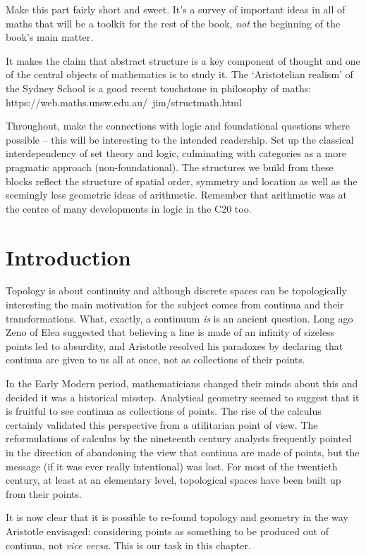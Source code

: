 \documentclass[oneside,english]{amsbook}
\numberwithin{section}{chapter}
\theoremstyle{plain}
\theoremstyle{definition}
\begin{document}
Make this part fairly short and sweet. It's a survey of important ideas in all of maths that will be a toolkit for the rest of the book, \emph{not} the beginning of the book's main matter.

It makes the claim that abstract structure is a key component of thought and one of the central objects of mathematics is to study it. The `Aristotelian realism' of the Sydney School is a good recent touchstone in philosophy of maths: https://web.maths.unsw.edu.au/~jim/structmath.html

Throughout, make the connections with logic and foundational questions where possible -- this will be interesting to the intended readership. Set up the classical interdependency of set theory and logic, culminating with categories as a more pragmatic approach (non-foundational). The structures we build from these blocks reflect the structure of spatial order, symmetry and location as well as the seemingly less geometric ideas of arithmetic. Remember that arithmetic was at the centre of many developments in logic in the C20 too.

\section{Introduction}

Topology is about continuity and although discrete spaces can be topologically interesting the main motivation for the subject comes from continua and their transformations. What, exactly, a continuum \emph{is} is an ancient question. Long ago Zeno of Elea suggested that believing a line is made of an infinity of sizeless points led to absurdity, and Aristotle resolved his paradoxes by declaring that continua are given to us all at once, not as collections of their points.

In the Early Modern period, mathematicians changed their minds about this and decided it was a historical misstep. Analytical geometry seemed to suggest that it is fruitful to see continua as collections of points. The rise of the calculus certainly validated this perspective from a utilitarian point of view. The reformulations of calculus by the nineteenth century analysts frequently pointed in the direction of abandoning the view that continua are made of points, but the message (if it was ever really intentional) was lost. For most of the twentieth century, at least at an elementary level, topological spaces have been built up from their points.

It is now clear that it is possible to re-found topology and geometry in the way Aristotle envisaged: considering points as something to be produced out of continua, not \emph{vice versa}. This is our task in this chapter.
\end{document}
